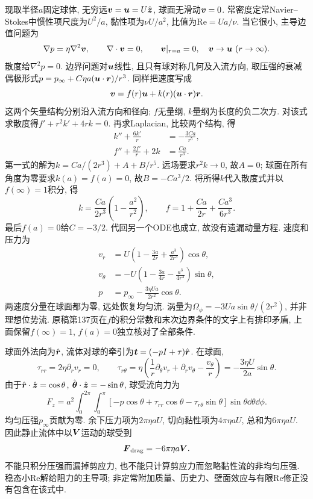 现取半径$a$固定球体, 无穷远$\boldsymbol{v}=\boldsymbol{u}=U\hat{\boldsymbol{z}}$, 球面无滑动$\boldsymbol{v}=0$. 常密度定常Navier--Stokes中惯性项尺度为$U^2/a$, 黏性项为$\nu U/a^2$, 比值为$\mathrm{Re}=Ua/\nu$. 当它很小, 主导边值问题为
\[
\nabla p=\eta\nabla^2\boldsymbol{v},\qquad \nabla\cdot\boldsymbol{v}=0,
\qquad \boldsymbol{v}|_{r=a}=0,\quad\boldsymbol{v}\to\boldsymbol{u}\ (r\to\infty).
\]
散度给$\nabla^2p=0$. 边界问题对$\boldsymbol{u}$线性, 且只有球对称几何及入流方向, 取压强的衰减偶极形式$p=p_\infty+C\eta a(\boldsymbol{u}\cdot\boldsymbol{r})/r^3$. 同样把速度写成
\[
\boldsymbol{v}=f(r)\boldsymbol{u}+k(r)(\boldsymbol{u}\cdot\boldsymbol{r})\boldsymbol{r}.
\]
这两个矢量结构分别沿入流方向和径向; $f$无量纲, $k$量纲为长度的负二次方. 对该式求散度得$f'+r^2k'+4rk=0$. 再求Laplacian, 比较两个结构, 得
\[
\begin{aligned}
k''+\frac{6k'}r&=-\frac{3Ca}{r^5},\\
f''+\frac{2f'}r+2k&=\frac{Ca}{r^3}.
\end{aligned}
\]
第一式的解为$k=Ca/(2r^3)+A+B/r^5$. 远场要求$r^2k\to0$, 故$A=0$; 球面在所有角度为零要求$k(a)=f(a)=0$, 故$B=-Ca^3/2$. 将所得$k$代入散度式并以$f(\infty)=1$积分, 得
\[
k=\frac{Ca}{2r^3}\left(1-\frac{a^2}{r^2}\right),\qquad
f=1+\frac{Ca}{2r}+\frac{Ca^3}{6r^3}.
\]
最后$f(a)=0$给$C=-3/2$. 代回另一个ODE也成立, 故没有遗漏动量方程. 速度和压力为
\[
\begin{aligned}
v_r&=U\left(1-\frac{3a}{2r}+\frac{a^3}{2r^3}\right)\cos\theta,\\
v_\theta&=-U\left(1-\frac{3a}{4r}-\frac{a^3}{4r^3}\right)\sin\theta,\\
p&=p_\infty-\frac{3\eta Ua}{2r^2}\cos\theta.
\end{aligned}
\]
两速度分量在球面都为零, 远处恢复均匀流. 涡量为$\Omega_\phi=-3Ua\sin\theta/(2r^2)$, 并非理想位势流. 原稿第137页在$f$的积分常数和末次边界条件的文字上有排印矛盾, 上面保留$f(\infty)=1$, $f(a)=0$独立核对了全部条件.

球面外法向为$\hat{\boldsymbol{r}}$, 流体对球的牵引为$\boldsymbol{t}=(-pI+\tau)\hat{\boldsymbol{r}}$. 在球面,
\[
\tau_{rr}=2\eta\partial_rv_r=0,\qquad
\tau_{r\theta}=\eta\left(\frac1r\partial_\theta v_r+
\partial_rv_\theta-\frac{v_\theta}r\right)
=-\frac{3\eta U}{2a}\sin\theta.
\]
由于$\hat{\boldsymbol{r}}\cdot\hat{\boldsymbol{z}}=\cos\theta$, $\hat{\boldsymbol{\theta}}\cdot\hat{\boldsymbol{z}}=-\sin\theta$, 球受流向力为
\[
F_z=a^2\int_0^{2\pi}\!\int_0^\pi
[-p\cos\theta+\tau_{rr}\cos\theta-\tau_{r\theta}\sin\theta]
\sin\theta\dd\theta\dd\phi.
\]
均匀压强$p_\infty$贡献为零. 余下压力项为$2\pi\eta aU$, 切向黏性项为$4\pi\eta aU$, 总和为$6\pi\eta aU$. 因此静止流体中以$\boldsymbol{V}$运动的球受到
\[
\boldsymbol{F}_{\mathrm{drag}}=-6\pi\eta a\boldsymbol{V}.
\]
不能只积分压强而漏掉剪应力, 也不能只计算剪应力而忽略黏性流的非均匀压强. 稳态小Re解给阻力的主导项; 非定常附加质量、历史力、壁面效应与有限Re修正没有包含在该式中.

